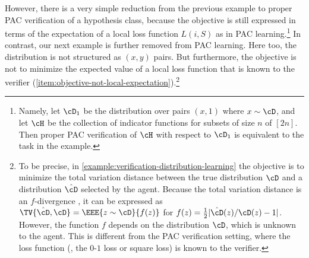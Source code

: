 \documentclass{toc}
\begin{document}
However, there is a very simple reduction from the previous example to proper PAC verification of a hypothesis class, because the objective is still expressed in terms of the expectation of a local loss function $L(i,S)$ as in PAC learning.\footnote{
	Namely, let $\cD_1$ be the distribution over pairs $(x,1)$ where $x \sim \cD$, and let $\cH$ be the collection of indicator functions for subsets of size $n$ of $[2n]$. Then proper PAC verification of $\cH$ with respect to $\cD_1$ is equivalent to the task in the example.
}
In contrast, our next example is further removed from PAC learning. Here too, the distribution is not structured as $(x,y)$ pairs. But furthermore, the objective is not to minimize the expected value of a local loss function that is known to the verifier (\cref{item:objective-not-local-expectation}).\footnote{
	To be precise, in \cref{example:verification-distribution-learning} the objective is to minimize the total variation distance between the true distribution $\cD$ and a distribution $\hat{\cD}$ selected by the agent. Because the total variation distance is an $f$-divergence \cite{renyi1961measures}, it can be expressed as $\TV{\hat{\cD}, \cD} = \EEE{z \sim \cD}{f(z)}$ for $f(z) = \frac{1}{2}|\hat{\cD}(z)/\cD(z)-1|$. However, the function $f$ depends on the distribution $\cD$, which is unknown to the agent. This is different from the PAC verification setting, where the loss function (\eg, the $0$-$1$ loss or square loss) is known to the verifier.
} 

\end{document}
